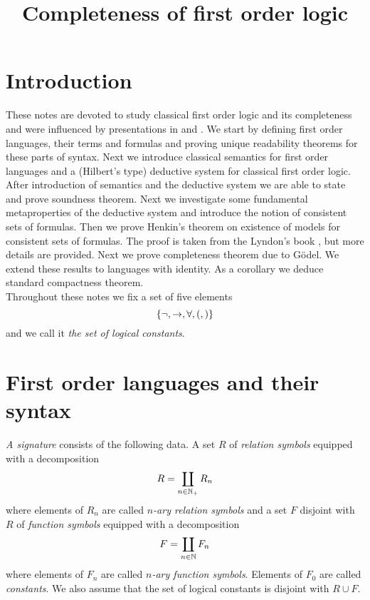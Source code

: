 \documentclass[10pt]{amsart}
\begin{document}
\title{Completeness of first order logic}
\date{}
\maketitle

\section{Introduction}
\noindent
These notes are devoted to study classical first order logic and its completeness and were influenced by presentations in \cite{enderton2001mathematical} and \cite{lyndon1966notes}. We start by defining first order languages, their terms and formulas and proving unique readability theorems for these parts of syntax. Next we introduce classical semantics for first order languages and a (Hilbert’s type) deductive system for classical first order logic. After introduction of semantics and the deductive system we are able to state and prove soundness theorem. Next we investigate some fundamental metaproperties of the deductive system and introduce the notion of consistent sets of formulas. Then we prove Henkin’s theorem on existence of models for consistent sets of formulas. The proof is taken from the Lyndon’s book \cite{lyndon1966notes}, but more details are provided. Next we prove completeness theorem due to Gödel. We extend these results to languages with identity. As a corollary we deduce standard compactness theorem.\\
Throughout these notes we fix a set of five elements
$$\{\neg, \rightarrow, \forall, (, )\}$$
and we call it \textit{the set of logical constants}.

\section{First order languages and their syntax}

\begin{definition}
	\textit{A signature} consists of the following data. A set $R$ of \textit{relation symbols} equipped with a decomposition
	$$R = \coprod_{n\in {\mathbb N}_+}R_n$$
	where elements of $R_n$ are called \textit{$n$-ary relation symbols} and a set $F$ disjoint with $R$ of \textit{function symbols} equipped with a decomposition
	$$F = \coprod_{n\in {\mathbb N}}F_n$$
	where elements of $F_n$ are called \textit{$n$-ary function symbols}. Elements of $F_0$ are called \textit{constants}. We also assume that the set of logical constants is disjoint with $R\cup F$.
\end{definition}
\end{document}
